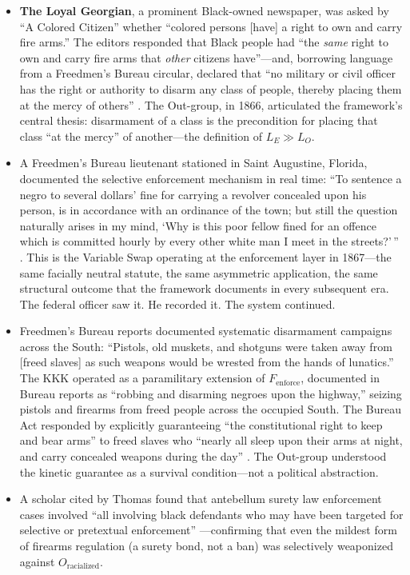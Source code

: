 \documentclass[12pt,openany]{book}
\begin{document}
\begin{itemize}
    \item \textbf{The Loyal Georgian}, a prominent Black-owned newspaper, was asked by ``A Colored Citizen'' whether ``colored persons [have] a right to own and carry fire arms.'' The editors responded that Black people had ``the \textit{same} right to own and carry fire arms that \textit{other} citizens have''---and, borrowing language from a Freedmen's Bureau circular, declared that ``no military or civil officer has the right or authority to disarm any class of people, thereby placing them at the mercy of others'' \cite{bruen}. The Out-group, in 1866, articulated the framework's central thesis: disarmament of a class is the precondition for placing that class ``at the mercy'' of another---the definition of $L_E \gg L_O$.

    \item A Freedmen's Bureau lieutenant stationed in Saint Augustine, Florida, documented the selective enforcement mechanism in real time: ``To sentence a negro to several dollars' fine for carrying a revolver concealed upon his person, is in accordance with an ordinance of the town; but still the question naturally arises in my mind, `Why is this poor fellow fined for an offence which is committed hourly by every other white man I meet in the streets?'\,'' \cite{bruen}. This is the Variable Swap operating at the enforcement layer in 1867---the same facially neutral statute, the same asymmetric application, the same structural outcome that the framework documents in every subsequent era. The federal officer saw it. He recorded it. The system continued.

    \item Freedmen's Bureau reports documented systematic disarmament campaigns across the South: ``Pistols, old muskets, and shotguns were taken away from [freed slaves] as such weapons would be wrested from the hands of lunatics.'' The KKK operated as a paramilitary extension of $F_{\text{enforce}}$, documented in Bureau reports as ``robbing and disarming negroes upon the highway,'' seizing pistols and firearms from freed people across the occupied South. The Bureau Act responded by explicitly guaranteeing ``the constitutional right to keep and bear arms'' to freed slaves who ``nearly all sleep upon their arms at night, and carry concealed weapons during the day'' \cite{bruen}. The Out-group understood the kinetic guarantee as a survival condition---not a political abstraction.

    \item A scholar cited by Thomas found that antebellum surety law enforcement cases involved ``all involving black defendants who may have been targeted for selective or pretextual enforcement'' \cite{bruen}---confirming that even the mildest form of firearms regulation (a surety bond, not a ban) was selectively weaponized against $O_{\text{racialized}}$.
\end{itemize}
\end{document}
